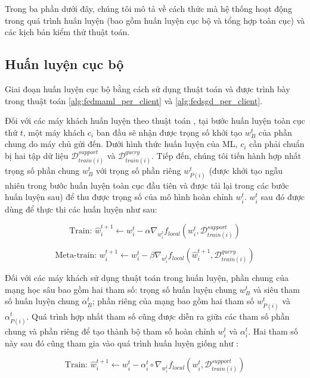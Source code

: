 Trong ba phần dưới đây, chúng tôi mô tả về cách thức mà hệ thống hoạt động trong quá trình huấn luyện (bao gồm huấn luyện cục bộ và tổng hợp toàn cục) và các kịch bản kiểm thử thuật toán.

\subsection{Huấn luyện cục bộ}

Giai đoạn huấn luyện cục bộ bằng cách sử dụng thuật toán  và  được trình bày trong thuật toán \ref{alg:fedmaml_per_client} và \ref{alg:fedsgd_per_client}. 

Đối với các máy khách huấn luyện theo thuật toán , tại bước huấn luyện toàn cục thứ $t$, một máy khách $c_i$ ban đầu sẽ nhận được trọng số khởi tạo $w_B^t$ của phần chung do máy chủ gửi đến. Dưới hình thức huấn luyện của ML, $c_i$ cần phải chuẩn bị hai tập dữ liệu $\mathcal{D}_{train(i)}^{support}$ và $\mathcal{D}_{train(i)}^{query}$. Tiếp đến, chúng tôi tiến hành hợp nhất trọng số phần chung $w_B^t$ với trọng số phần riêng $w_{P(i)}^t$ (được khởi tạo ngẫu nhiên trong bước huấn luyện toàn cục đầu tiên và được tải lại trong các bước huấn luyện sau) để thu được trọng số của mô hình hoàn chỉnh $w_i^t$. $w_i^t$ sau đó được dùng để thực thi các huấn luyện như sau:

\begin{dmath}
    \text{Train: } \hat{w}_{i}^{t+1} \gets w_{i}^t - \alpha\nabla_{w_i^t} f_{local}(w_{i}^t, \mathcal{D}_{train(i)}^{support})
\end{dmath}

\begin{dmath}
    \text{Meta-train: } w_{i}^{t+1} \gets w_{i}^t - \beta\nabla_{w_i^t} f_{local}(\hat{w}_{i}^{t+1}, \mathcal{D}_{train(i)}^{query})
\end{dmath}

Đối với các máy khách sử dụng thuật toán  trong huấn luyện, phần chung của mạng học sâu bao gồm hai tham số: trọng số huấn luyện chung $w_B^{t}$ và siêu tham số huấn luyện chung $\alpha_B^{t}$; phần riêng của mạng bao gồm hai tham số $w_{P(i)}^{t}$ và $\alpha_{P(i)}^{t}$. Quá trình hợp nhất tham số cũng được diễn ra giữa các tham số phần chung và phần riêng để tạo thành bộ tham số hoàn chỉnh $w_i^t$ và $\alpha_i^t$. Hai tham số này sau đó cũng tham gia vào quá trình huấn luyện giống như :

\begin{dmath}
    \text{Train: } \hat{w}_{i}^{t+1} \gets w_{i}^t - \alpha_i^t\circ\nabla_{w_i^t} f_{local}(w_{i}^t, \mathcal{D}_{train(i)}^{support})
\end{dmath}

